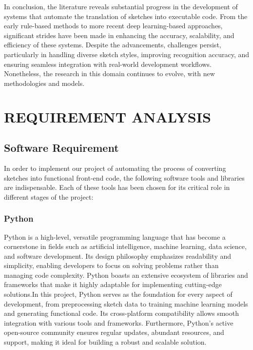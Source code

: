 In conclusion, the literature reveals substantial progress in the development of systems that 
automate the translation of sketches into executable code. From the early rule-based methods 
to more recent deep learning-based approaches, significant strides have been made in enhancing
 the accuracy, scalability, and efficiency of these systems. Despite the advancements,
challenges persist, particularly in handling diverse sketch styles, improving recognition
accuracy, and ensuring seamless integration with real-world development workflows. 
Nonetheless, the research in this domain continues to evolve, with new methodologies and models.
\pagebreak
\section{\MakeUppercase{Requirement Analysis}}
    \subsection{Software Requirement}
    In order to implement our project of automating the process of converting sketches into functional front-end code, the following software tools and libraries are indispensable. Each of these tools has been chosen for its critical role in different stages of the project:
    \subsubsection{Python}
Python is a high-level, versatile programming language that has become a cornerstone in fields such as artificial intelligence, machine learning, data science, and software development. Its design philosophy emphasizes readability and simplicity, enabling developers to focus on solving problems rather than managing code complexity. Python boasts an extensive ecosystem of libraries and frameworks that make it highly adaptable for implementing cutting-edge solutions.In this project, Python serves as the foundation for every aspect of development, from preprocessing sketch data to training machine learning models and generating functional code. Its cross-platform compatibility allows smooth integration with various tools and frameworks. Furthermore, Python’s active open-source community ensures regular updates, abundant resources, and support, making it ideal for building a robust and scalable solution.
